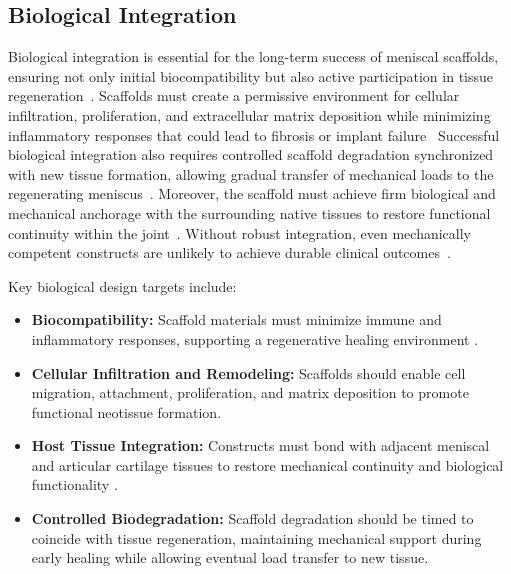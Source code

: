 \subsection{Biological Integration}

Biological integration is essential for the long-term success of meniscal scaffolds, ensuring not only initial biocompatibility but also active participation in tissue regeneration~\cite{ma2025structurallysophisticated, li20213dprinted, li2024advancedhydrogel, luis20203ddirect, shamloo2018acceleratedfullthickness}.
Scaffolds must create a permissive environment for cellular infiltration, proliferation, and extracellular matrix deposition while minimizing inflammatory responses that could lead to fibrosis or implant failure~\cite{shamloo2018acceleratedfullthickness, xu2013hybridprinting}
Successful biological integration also requires controlled scaffold degradation synchronized with new tissue formation, allowing gradual transfer of mechanical loads to the regenerating meniscus~\cite{morenonieto2021productdesign, pitt1981aliphaticpolyesters}.
Moreover, the scaffold must achieve firm biological and mechanical anchorage with the surrounding native tissues to restore functional continuity within the joint~\cite{ghodbane2019partialmeniscus}.
Without robust integration, even mechanically competent constructs are unlikely to achieve durable clinical outcomes~\cite{bakerengineeringanatomicallyshaped}.

Key biological design targets include:

\begin{itemize}
    \item \textbf{Biocompatibility:} Scaffold materials must minimize immune and inflammatory responses, supporting a regenerative healing environment \cite{beeler2020meniscussizing, christino2019meniscal}.
    
    \item \textbf{Cellular Infiltration and Remodeling:} Scaffolds should enable cell migration, attachment, proliferation, and matrix deposition to promote functional neotissue formation\cite{gupta2020meniscaltissue,du2023meniscusheterogeneity}.
    
    \item \textbf{Host Tissue Integration:} Constructs must bond with adjacent meniscal and articular cartilage tissues to restore mechanical continuity and biological functionality \cite{li2024totalmeniscus,mauck2000functionaltissue,pokhrel2020meniscal}.
    
    \item \textbf{Controlled Biodegradation:} Scaffold degradation should be timed to coincide with tissue regeneration, maintaining mechanical support during early healing while allowing eventual load transfer to new tissue\cite{wang20203dprinting,choi20213dprintedgelatin}.
\end{itemize}

